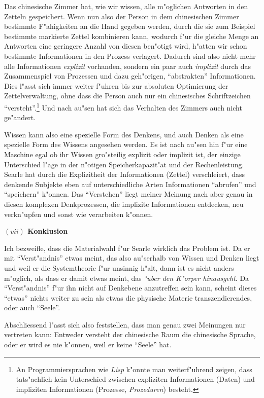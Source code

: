 \documentclass[a4paper, emulatestandardclasses, 12pt]{scrartcl}
\begin{document}
\begin{onehalfspace}
Das chinesische Zimmer hat, wie wir wissen, alle m"oglichen Antworten in den Zetteln gespeichert. Wenn nun also der Person in dem chinesischen Zimmer bestimmte F"ahigkeiten an die Hand gegeben werden, durch die sie zum Beispiel bestimmte markierte Zettel kombinieren kann, wodurch f"ur die gleiche Menge an Antworten eine geringere Anzahl von diesen ben"otigt wird, h"atten wir schon bestimmte Informationen in den Prozess verlagert. Dadurch sind also nicht mehr alle Informationen \emph{explizit} vorhanden, sondern ein paar auch \emph{implizit} durch das Zusammenspiel von Prozessen und dazu geh"origen, "`abstrakten"' Informationen. Dies l"asst sich immer weiter f"uhren bis zur absoluten Optimierung der Zettelverwaltung, ohne dass die Person auch nur ein chinesisches Schriftzeichen "`versteht"'.\footnote{An Programmiersprachen wie \emph{Lisp} k"onnte man weiterf"uhrend zeigen, dass tats"achlich kein Unterschied zwischen expliziten Informationen (Daten) und impliziten Informationen (Prozesse, \emph{Prozeduren}) besteht.} Und nach au"sen hat sich das Verhalten des Zimmers auch nicht ge"andert. 

Wissen kann also eine spezielle Form des Denkens, und auch Denken als eine spezielle Form des Wissens angesehen werden. Es ist nach au"sen hin f"ur eine Maschine egal ob ihr Wissen gro"steilig explizit oder implizit ist, der einzige Unterschied l"age in der n"otigen Speicherkapazit"at und der Rechenleistung. Searle hat durch die Explizitheit der Informationen (Zettel) verschleiert, dass denkende Subjekte eben auf unterschiedliche Arten  Informationen "`abrufen"' und  "`speichern"' k"onnen. Das "`Verstehen"' liegt meiner Meinung nach aber genau in diesen komplexen Denkprozessen, die implizite Informationen entdecken, neu verkn"upfen und sonst wie verarbeiten k"onnen.

\vspace{5mm}
\noindent\textbf{$(vii)$ Konklusion}

\noindent Ich bezweifle, dass die Materialwahl f"ur Searle wirklich das Problem ist. Da er mit "`Verst"andnis"' etwas meint, das also au"serhalb von Wissen und Denken liegt und weil er die Systemtheorie f"ur unsinnig h"alt, dann ist es nicht anders m"oglich, als dass er damit etwas meint, das \emph{"uber den K"orper hinausgeht}. Da "`Verst"andnis"' f"ur ihn nicht auf Denkebene anzutreffen sein kann, scheint dieses "`etwas"' nichts weiter zu sein als etwas die physische Materie transzendierendes, oder auch "`Seele"'.

Abschliessend l"asst sich also feststellen, dass man genau zwei Meinungen nur vertreten kann: Entweder versteht der chinesische Raum die chinesische Sprache, oder er wird es nie k"onnen, weil er keine "`Seele"' hat. 





\end{onehalfspace}
\end{document}
